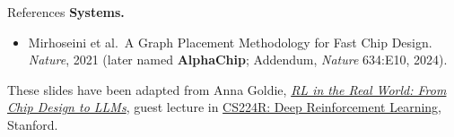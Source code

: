\begin{frame}[allowframebreaks]{References}
\framebreak
\textbf{Systems.}
\begin{itemize}\itemsep0.15em
    \item Mirhoseini et al.\ A Graph Placement Methodology for Fast Chip Design.
          \emph{Nature}, 2021 (later named \textbf{AlphaChip}; Addendum,
          \emph{Nature} 634:E10, 2024).
\end{itemize}
\vfill
These slides have been adapted from Anna Goldie,
\href{https://cs224r.stanford.edu/spring_2023/slides/cs224r_practical_deep_rl.pdf}{\emph{RL
in the Real World: From Chip Design to LLMs}}, guest lecture in
\href{https://cs224r.stanford.edu/}{CS224R: Deep Reinforcement Learning}, Stanford.
\end{frame}
